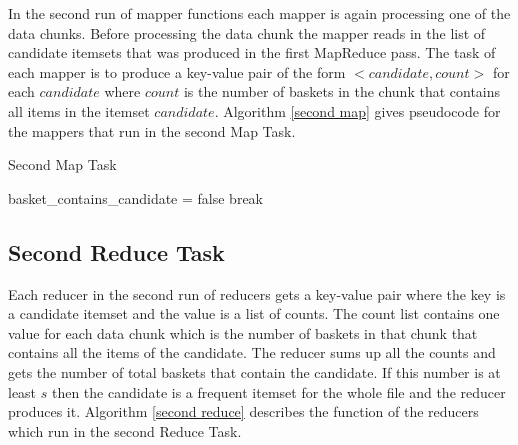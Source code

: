 In the second run of mapper functions each mapper is again processing one of the data chunks. Before processing the data chunk the mapper reads in the list of candidate itemsets that was produced in the first MapReduce pass. The task of each mapper is to produce a key-value pair of the form $<candidate, count>$ for each $candidate$ where $count$ is the number of baskets in the chunk that contains all items in the itemset $candidate$. Algorithm \ref{second map} gives pseudocode for the mappers that run in the second Map Task.
\begin{algorithm}
  \caption{Second Map Task}\label{second map}
  \begin{algorithmic}[1]
            		\State basket\_contains\_candidate = false
            		\State break
            	\EndIf
            \EndFor
            \EndIf
            \EndFor
       \EndFor
       
        \EndFor
      
    \EndFunction
\end{algorithmic}
\end{algorithm}

\subsection{Second Reduce Task}\label{second reduce task}
Each reducer in the second run of reducers gets a key-value pair where the key is a candidate itemset and the value is a list of counts. The count list contains one value for each data chunk which is the number of baskets in that chunk that contains all the items of the candidate. The reducer sums up all the counts and gets the number of total baskets that contain the candidate. If this number is at least $s$ then the candidate is a frequent itemset for the whole file and the reducer produces it. Algorithm \ref{second reduce} describes the function of the reducers which run in the second Reduce Task.

